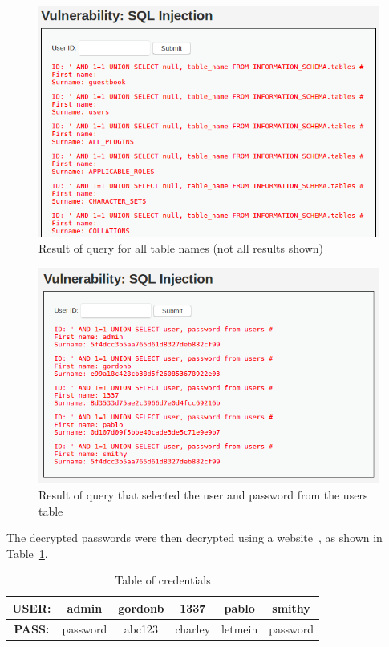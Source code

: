 \documentclass[11pt]{article}
\begin{document}
\begin{figure}[htbp]
  \centering
  \includegraphics[width=1\linewidth]{./sql-2.png}
  \caption{\label{fig:sql-2}
  Result of query for all table names (not all results shown)}
\end{figure}
\begin{figure}[htbp]
  \centering
  \includegraphics[width=1\linewidth]{./sql-3.png}
  \caption{\label{fig:sql-3}
  Result of query that selected the user and password from the users table}
\end{figure}
The decrypted passwords were then decrypted using a website~\cite{md5}, as shown in Table~\ref{table:creds}.
\begin{table}[h]
  \centering
  \begin{tabular}{ |c|c|c|c|c|c| }
    \hline
    \textbf{USER:} & admin    & gordonb & 1337    & pablo   & smithy   \\ \hline
    \textbf{PASS:} & password & abc123  & charley & letmein & password \\ \hline
  \end{tabular}
  \caption{\label{table:creds}
  Table of credentials}
\end{table}
\end{document}
